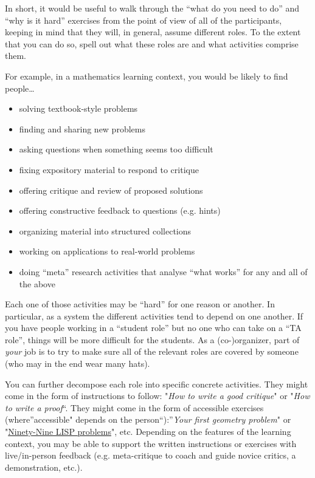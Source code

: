 In short, it would be useful to walk through the ``what do you need to
do'' and ``why is it hard'' exercises from the point of view of all of
the participants, keeping in mind that they will, in general, assume
different roles. To the extent that you can do so, spell out what these
roles are and what activities comprise them.

For example, in a mathematics learning context, you would be likely to
find people\ldots{}

\begin{itemize}
\item
  solving textbook-style problems
\item
  finding and sharing new problems
\item
  asking questions when something seems too difficult
\item
  fixing expository material to respond to critique
\item
  offering critique and review of proposed solutions
\item
  offering constructive feedback to questions (e.g. hints)
\item
  organizing material into structured collections
\item
  working on applications to real-world problems
\item
  doing ``meta'' research activities that analyse ``what works'' for any
  and all of the above
\end{itemize}
Each one of those activities may be ``hard'' for one reason or another.
In particular, as a system the different activities tend to depend on
one another. If you have people working in a ``student role'' but no one
who can take on a ``TA role'', things will be more difficult for the
students. As a (co-)organizer, part of \emph{your} job is to try to make
sure all of the relevant roles are covered by someone (who may in the
end wear many hats).

You can further decompose each role into specific concrete activities.
They might come in the form of instructions to follow: "\emph{How to
write a good critique}" or "\emph{How to write a proof}``. They might
come in the form of accessible exercises (where''accessible" depends on
the person``):''\emph{Your first geometry problem}" or
"\href{http://www.ic.unicamp.br/\%7Emeidanis/courses/mc336/2006s2/funcional/L-99\_Ninety-Nine\_Lisp\_Problems.html}{Ninety-Nine
LISP problems}", etc. Depending on the features of the learning context,
you may be able to support the written instructions or exercises with
live/in-person feedback (e.g. meta-critique to coach and guide novice
critics, a demonstration, etc.).

